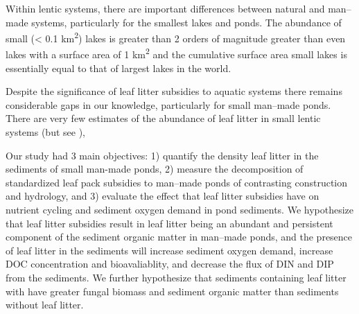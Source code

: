 Within lentic systems, there are important differences between natural and man--made systems, particularly for the smallest lakes and ponds. The abundance of small (< 0.1 km\textsuperscript{2}) lakes is greater than 2 orders of magnitude greater than even lakes with a surface area of 1 km\textsuperscript{2} \cite{Downing_2010} and the cumulative surface area small lakes is essentially equal to that of largest lakes in the world.  

Despite the significance of leaf litter subsidies to aquatic systems there remains considerable gaps in our knowledge, particularly for small man--made ponds.  There are very few estimates of the abundance of leaf litter in small lentic systems (but see ),  

Our study had 3 main objectives: 1) quantify the density leaf litter in the sediments of small man-made ponds, 2) measure the decomposition of standardized leaf pack subsidies to man--made ponds of contrasting construction and hydrology, and 3) evaluate the effect that leaf litter subsidies have on nutrient cycling and sediment oxygen demand in pond sediments. We hypothesize that leaf litter subsidies result in leaf litter being an abundant and persistent component of the sediment organic matter in man--made ponds, and the presence of leaf litter in the sediments will increase sediment oxygen demand, increase DOC concentration and bioavaliablity, and decrease the flux of DIN and DIP from the sediments. We further hypothesize that sediments containing leaf litter with have greater fungal biomass and sediment organic matter than sediments without leaf litter.